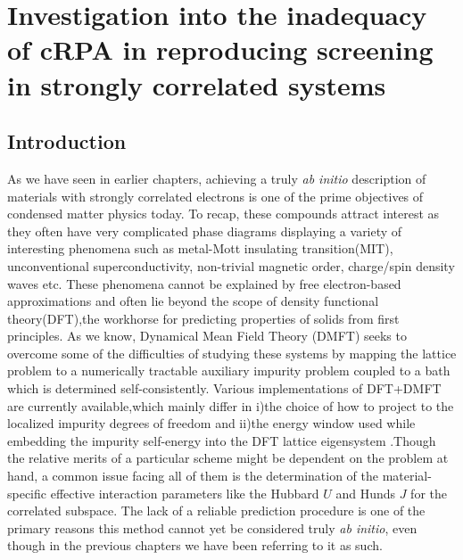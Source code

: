 \documentclass[10pt]{ruthesis}
\begin{document}
{\pagebreak
\chapter{Investigation into the inadequacy of cRPA in reproducing screening in strongly correlated systems}
\section{Introduction}
 As we have seen in earlier chapters, achieving a truly \emph{ab initio} description of  materials with strongly correlated electrons is one of the prime objectives of condensed matter physics today. To recap, these compounds attract interest as they often have very complicated phase diagrams displaying a variety of interesting phenomena such as  metal-Mott insulating transition(MIT), unconventional superconductivity, non-trivial magnetic order, charge/spin density waves etc\cite{RMP_MIT_1998_Imada}. These phenomena cannot be explained by free electron-based approximations and often lie beyond the scope of density functional theory(DFT),the workhorse for predicting properties of solids from first principles\cite{RMP_dft_review_1989_R_O_Jones}. As we know, Dynamical Mean Field Theory (DMFT) seeks to overcome some of the difficulties of studying these systems by mapping the lattice problem to a numerically tractable auxiliary impurity problem coupled to a bath which is determined self-consistently. Various implementations of DFT+DMFT are currently available\cite{PRB_Wannier_Downfolding_2006_D.Vollhardt,PRB_Wannier_Downfolding_2006_O.K.Andersen,PRB_localorbital_Downfolding_2008_Lichtenstein,PRB_dmft_wien2k_2010_Chuck_Haule,PRB_LaFeAsO_2010_A.Georges,PRB_covalency_TMoxides_2014_k.Haule},which mainly differ in i)the choice of how to project to the localized impurity degrees of freedom and ii)the energy window used while embedding the impurity self-energy into the DFT lattice eigensystem .Though the relative merits of a particular scheme might be dependent on the problem at hand, a common issue facing all of them is the determination of the material-specific effective interaction parameters like the Hubbard $U$ and Hunds $J$ for the correlated subspace. The lack of a reliable prediction procedure is one of the primary reasons this method cannot yet be considered truly \emph{ab initio}, even though in the previous chapters we have been referring to it as such.

}
\end{document}
